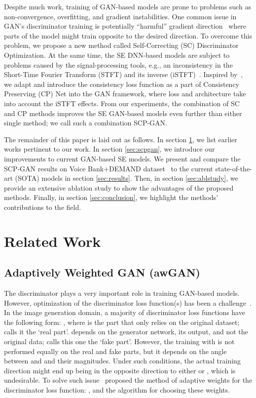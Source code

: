 \documentclass{article}
\begin{document}
Despite much work, training of GAN-based models are prone to problems such as non-convergence, overfitting, and gradient instabilities. One  common issue in GAN's discriminator training is potentially ``harmful'' gradient direction~\cite{Zadorozhnyy_2021_CVPR} where parts of the model might train opposite to the desired direction. To overcome this problem, we propose a new method called Self-Correcting (SC) Discriminator Optimization. At the same time, the SE DNN-based models are subject to problems caused by the signal-processing tools, e.g., an inconsistency in the Short-Time Fourier Transform (STFT) and its inverse (iSTFT)~\cite{Wisdom2019DifferentiableCC,le2010fast}. Inspired by~\cite{Braun2021TowardsEM}, we adapt and introduce the consistency loss function as a part of Consistency Preserving (CP) Net into the GAN framework, where loss and architecture take into account the iSTFT effects. From our experiments, the combination of SC and CP methods improves the SE GAN-based models even further than either single method; we call such a combination SCP-GAN.




The remainder of this paper is laid out as follows. In section \ref{sec:relatedwork}, we list earlier works pertinent to our work. In section \ref{sec:scpgan}, we introduce our improvements to current GAN-based SE models. We present and compare the SCP-GAN results on Voice Bank+DEMAND dataset~\cite{ValentiniBotinhao2016InvestigatingRS} to the current state-of-the-art (SOTA) models in section \ref{sec:results}. Then, in section \ref{sec:ablstudy}, we provide an extensive ablation study to show the advantages of the proposed methods. Finally, in section \ref{sec:conclusion}, we highlight the methods' contributions to the field.

\section{Related Work}\label{sec:relatedwork}



\subsection{Adaptively Weighted GAN (awGAN)}\label{ss:awgan}
The discriminator plays a very important role in training GAN-based models. However, optimization of the discriminator loss function(s) has been a challenge~\cite{Zadorozhnyy_2021_CVPR}. In the image generation domain, a majority of discriminator loss functions have the following form: , where  is the part that only relies on the original dataset; \cite{Zadorozhnyy_2021_CVPR} calls it the `real part'.  depends on the generator network, its output, and not the original data; \cite{Zadorozhnyy_2021_CVPR} calls this one the `fake part'. However, the training with  is not performed equally on the real and fake parts, but it depends on the angle between  and  and their magnitudes. Under such conditions, the actual training direction  might end up being in the opposite direction to either  or , which is undesirable. To solve such issue~\cite{Zadorozhnyy_2021_CVPR} proposed the method of adaptive weights for the discriminator loss function: , and the algorithm for choosing these weights.
\end{document}
